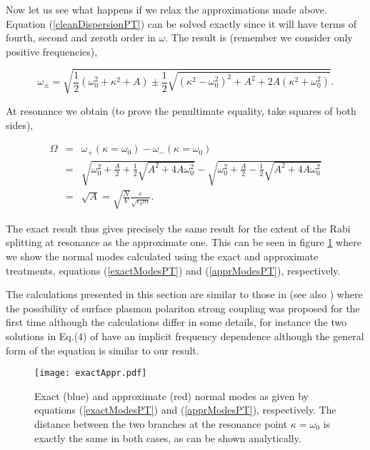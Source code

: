 \documentclass[12pt]{iopart}
\begin{document}
Now let us see what happens if we relax the approximations made above. Equation (\ref{cleanDispersionPT}) can be solved exactly since it will have terms of fourth, second and zeroth order in $\omega$. The result is (remember we consider only positive frequencies),

\begin{equation}
\omega_\pm = \sqrt{\frac{1}{2} (\omega_0^2 + \kappa^2 + A)\pm \frac{1}{2} \sqrt{(\kappa^2-\omega_0^2)^2 + A^2 + 2 A (\kappa^2 
+ \omega_0^2)}}. \label{exactModesPT}
\end{equation} 
  
\noindent At resonance we obtain (to prove the penultimate equality, take squares of both sides),
 
\begin{eqnarray}
\Omega &=& \omega_+(\kappa=\omega_0) - \omega_-(\kappa=\omega_0) \\
&=& \sqrt{\omega_0^2 + \frac{A}{2} + \frac{1}{2} \sqrt{A^2 + 4 A \omega_0^2}}
- \sqrt{\omega_0^2 + \frac{A}{2} - \frac{1}{2} \sqrt{A^2 + 4 A \omega_0^2}} \\
&=& \sqrt{A} = \sqrt{\frac{N}{V}} \frac{e}{\sqrt{\epsilon_0 m}} . 
\end{eqnarray}

\noindent The exact result thus gives precisely the same result for the extent of the Rabi splitting at resonance as the approximate one. This can be seen in figure \ref{analyticalPlotPT} where we show the normal modes calculated using the exact and approximate treatments, equations (\ref{exactModesPT}) and (\ref{apprModesPT}), respectively. 

The calculations presented in this section are similar to those in \cite{Agranovich1974} (see also \cite{Agranovich1975,Agranovich1980}) where the possibility of surface plasmon polariton strong coupling was proposed for the first time although the calculations differ in some details, for instance the two solutions in Eq.(4) of \cite{Agranovich1974} have an implicit frequency dependence although the general form of the equation is similar to our result. 

\begin{figure}
\texttt{[image: exactAppr.pdf]}
\caption{Exact (blue) and approximate (red) normal modes as given by equations (\ref{exactModesPT}) and (\ref{apprModesPT}), respectively. The distance between the two branches at the resonance point $\kappa=\omega_0$ is exactly the same in both cases, as can be shown analytically.} 
\label{analyticalPlotPT}
\end{figure}
\end{document}
